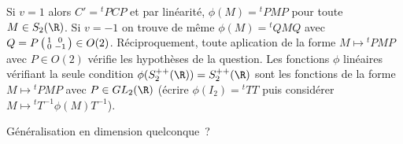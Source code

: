 {\begin{enumerate}
{    Si $v=1$ alors $C' = {}^tPCP$ et par linéarité, $\phi(M)={}^tPMP$
    pour toute $M\in S_2(\R)$.
    Si $v=-1$ on trouve de même $\phi(M) = {}^tQMQ$ avec $Q=P\left(\begin{smallmatrix}1&0\cr0&-1\cr\end{smallmatrix}\right)\in O(2)$.
    Réciproquement, toute aplication de la forme $M  \mapsto{}^tPMP$ avec $P\in O(2)$
    vérifie les hypothèses de la question. Les fonctions $\phi$
    linéaires vérifiant la seule condition $\phi(S_2^{++}(\R)) = S_2^{++}(\R)$
    sont les fonctions de la forme $M \mapsto{}^tPMP$ avec $P\in GL_2(\R)$
    (écrire $\phi(I_2) = {}^tTT$ puis considérer $M \mapsto{}^tT^{-1}\phi(M)T^{-1}$).
    
    Généralisation en dimension quelconque~?}
\end{enumerate}
}
